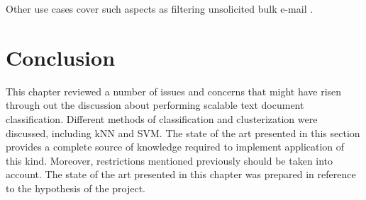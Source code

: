 		Other use cases cover such aspects as filtering unsolicited bulk e-mail \cite{naive-bayesian}. 

\section{Conclusion}
This chapter reviewed a number of issues and concerns that might have risen through out the discussion about performing scalable text document classification. Different methods of classification and clusterization were discussed, including kNN and SVM. The state of the art presented in this section provides a complete source of knowledge required to implement application of this kind. Moreover, restrictions mentioned previously should be taken into account. The state of the art presented in this chapter was prepared in reference to the hypothesis of the project.
